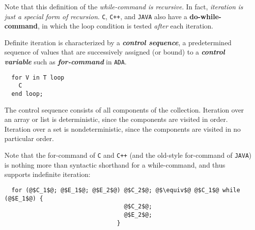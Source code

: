 Note that this definition of the \textit{while-command is recursive}. In fact, \textit{iteration is just a special form of recursion}. \texttt{C}, \texttt{C++}, and \texttt{JAVA} also have a \textbf{do-while-command}, in which the loop condition is tested \textit{after} each iteration.

Definite iteration is characterized by a \textit{\textbf{control sequence}}, a predetermined sequence of values that are successively assigned (or bound) to a \textit{\textbf{control variable}} such as \textbf{\textit{for-command}} in \texttt{ADA}.
\begin{verbatim}
  for V in T loop
    C
  end loop;
\end{verbatim}

The control sequence consists of all components of the collection. Iteration over an array or list is deterministic, since the components are visited in order. Iteration over a set is nondeterministic, since the components are visited in no particular order.

Note that the for-command of \texttt{C} and \texttt{C++} (and the old-style for-command of \texttt{JAVA}) is nothing more than syntactic shorthand for a while-command, and thus supports indefinite iteration:
\begin{verbatim}
  for (@$C_1$@; @$E_1$@; @$E_2$@) @$C_2$@; @$\equiv$@ @$C_1$@ while (@$E_1$@) {
                                  @$C_2$@;
                                  @$E_2$@;
                                }
\end{verbatim}
